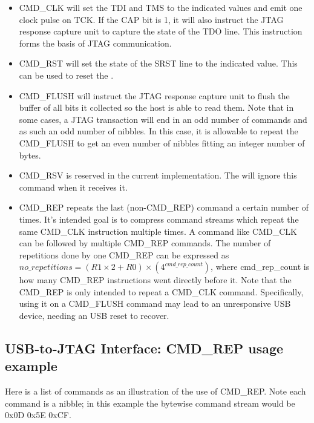 \documentclass[main\_\_EN.tex]{subfiles}
\begin{document}
\begin{itemize}
\item CMD\_CLK will set the TDI and TMS to the indicated values and emit one clock pulse on TCK. If the CAP bit is 1, it will also instruct the JTAG response capture unit to capture the state of the TDO line. This instruction forms the basis of JTAG communication.

\item CMD\_RST will set the state of the SRST line to the indicated value. This can be used to reset the \chipname{}.

\item CMD\_FLUSH will instruct the JTAG response capture unit to flush the buffer of all bits it collected so the host is able to read them. Note that in some cases, a JTAG transaction will end in an odd number of commands and as such an odd number of nibbles. In this case, it is allowable to repeat the CMD\_FLUSH to get an even number of nibbles fitting an integer number of bytes.

\item CMD\_RSV is reserved in the current implementation. The \chipname{} will ignore this command when it receives it.

\item CMD\_REP repeats the last (non-CMD\_REP) command a certain number of times. It's intended goal is to compress command streams which repeat the same CMD\_CLK instruction multiple times. A command like CMD\_CLK can be followed by multiple CMD\_REP commands. The number of repetitions done by one CMD\_REP can be expressed as \begin{math}no\_repetitions = (R1 \times 2 + R0) \times (4^{cmd\_rep\_count})\end{math}, where cmd\_rep\_count is how many CMD\_REP instructions went directly before it. Note that the CMD\_REP is only intended to repeat a CMD\_CLK command. Specifically, using it on a CMD\_FLUSH command may lead to an unresponsive USB device, needing an USB reset to recover.
\end{itemize}

\subsection{USB-to-JTAG Interface: CMD\_REP usage example}    


Here is a list of commands as an illustration of the use of CMD\_REP.
Note each command is a nibble; in this example the bytewise command stream would be 0x0D 0x5E 0xCF.
\end{document}
